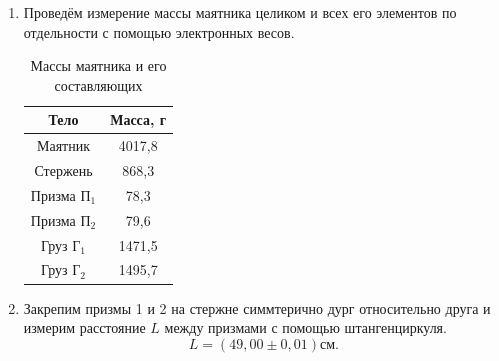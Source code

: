 \documentclass[a4paper,12 pt]{article}
\begin{document}
\begin{enumerate}
    \item Проведём измерение массы маятника целиком и всех его элементов по отдельности с помощью электронных весов. 
    \begin{table}[H]
        \centering
        \begin{tabular}{|c|c|}
            \hline
            Тело & Масса, г \\
            \hline
            Маятник & 4017,8 \\
            \hline
            Стержень & 868,3 \\
            \hline
            Призма $\text{П}_1$ & 78,3 \\
            \hline
            Призма $\text{П}_2$ & 79,6 \\
            \hline
            Груз $\text{Г}_1$ & 1471,5 \\
            \hline
            Груз $\text{Г}_2$ & 1495,7 \\
            \hline
        \end{tabular}
        \caption{Массы маятника и его составляющих}
    \end{table}
    \item Закрепим призмы 1 и 2 на стержне симмтерично дург относительно друга и измерим расстояние $L$ между призмами с помощью штангенциркуля.
    \begin{displaymath}
        L = (49,00 \pm 0,01) \text{см}.
    \end{displaymath}


\end{enumerate}
\end{document}
